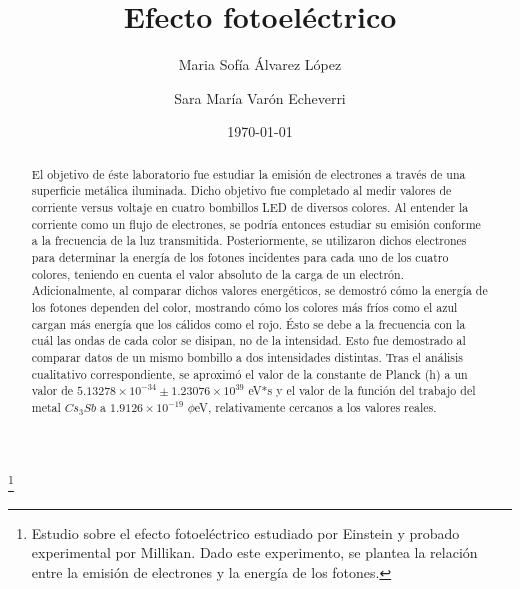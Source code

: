 \documentclass[%
 reprint,
 amsmath,amssymb,
 aps,
]{revtex4-1}
\begin{document}
\title{Efecto fotoeléctrico}%
\thanks{Estudio sobre el efecto fotoeléctrico estudiado por Einstein y probado experimental por Millikan. Dado este experimento, se plantea la relación entre la emisión de electrones y la energía de los fotones.}%

\author{Maria Sofía Álvarez López}%
%

\author{Sara María Varón Echeverri}
%

\date{\today}%

\begin{abstract}
El objetivo de éste laboratorio fue estudiar la emisión de electrones a través de una superficie metálica iluminada. Dicho objetivo fue completado al medir valores de corriente versus voltaje en cuatro bombillos LED de diversos colores. Al entender la corriente como un flujo de electrones, se podría entonces estudiar su emisión conforme a la frecuencia de la luz transmitida. Posteriormente, se utilizaron dichos electrones para determinar la energía de los fotones incidentes para cada uno de los cuatro colores, teniendo en cuenta el valor absoluto de la carga de un electrón. Adicionalmente, al comparar dichos valores energéticos, se demostró cómo la energía de los fotones dependen del color, mostrando cómo los colores más fríos como el azul cargan más energía que los cálidos como el rojo. Ésto se debe a la frecuencia con la cuál las ondas de cada color se disipan, no de la intensidad. Esto fue demostrado al comparar datos de un mismo bombillo a dos intensidades distintas. Tras el análisis cualitativo correspondiente, se aproximó el valor de la constante de Planck (h) a un valor de $5.13278 \times 10^{-34} \pm 1.23076 \times 10^{39}$ eV*s y el valor de la función del trabajo del metal $Cs_3Sb$ a $1.9126 \times 10^{-19}$ $\phi$eV, relativamente cercanos a los valores reales.
\end{abstract}

\maketitle
\end{document}
